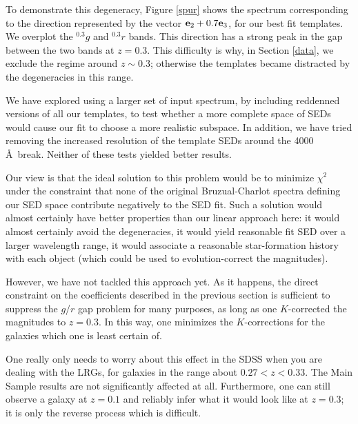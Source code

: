 \documentclass[10pt,preprint]{aastex}
\newcommand{\vv}[1]{{\bf #1}}
\newcommand{\band}[2]{\ensuremath{^{#1}\!{#2}}}
\begin{document}
To demonstrate this degeneracy, Figure \ref{spur} shows the spectrum
corresponding to the direction represented by the vector $ \vv{e}_2 +
0.7 \vv{e}_3$, for our best fit templates. We overplot the
\band{0.3}{g} and \band{0.3}{r} bands. This direction has a strong
peak in the gap between the two bands at $z=0.3$.  This difficulty is
why, in Section \ref{data}, we exclude the regime around $z\sim 0.3$;
otherwise the templates became distracted by the degeneracies in this
range.

We have explored using a larger set of input spectrum, by including
reddenned versions of all our templates, to test whether a more
complete space of SEDs would cause our fit to choose a more realistic
subspace. In addition, we have tried removing the increased resolution
of the template SEDs around the 4000 \AA\ break. Neither of these tests
yielded better results. 

Our view is that the ideal solution to this problem would be to
minimize $\chi^2$ under the constraint that none of the original
Bruzual-Charlot spectra defining our SED space contribute negatively
to the SED fit. Such a solution would almost certainly have better
properties than our linear approach here: it would almost certainly
avoid the degeneracies, it would yield reasonable fit SED over a
larger wavelength range, it would associate a reasonable
star-formation history with each object (which could be used to
evolution-correct the magnitudes).

However, we have not tackled this approach yet. As it happens, the
direct constraint on the coefficients described in the previous
section is sufficient to suppress the $g$/$r$ gap problem 
for many purposes, as long as one $K$-corrected the magnitudes to
$z=0.3$. In this way, one minimizes the $K$-corrections for the
galaxies which one is least certain of.

One really only needs to worry about this effect in the SDSS when you
are dealing with the LRGs, for galaxies in the range about $0.27 < z <
0.33$. The Main Sample results are not significantly affected at all.
Furthermore, one can still observe a galaxy at $z=0.1$ and reliably
infer what it would look like at $z=0.3$; it is only the reverse
process which is difficult.

\end{document}
